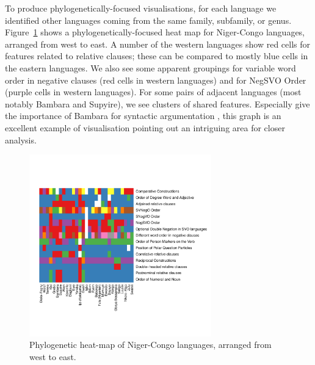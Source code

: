 \documentclass[11pt]{article}
\begin{document}
To produce phylogenetically-focused visualisations, for each language we identified other languages coming from the same family, subfamily, or genus. Figure~\ref{fig:heat2} shows a phylogenetically-focused heat map for Niger-Congo languages, arranged from west to east. A number of the western languages show red cells for features related to relative clauses; these can be compared to mostly blue cells in the eastern languages. We also see some apparent groupings for variable word order in negative clauses (red cells in western languages) and for NegSVO Order (purple cells in western languages). For some pairs of adjacent languages (most notably Bambara and Supyire), we see clusters of shared features. Especially give the importance of Bambara for 
syntactic argumentation \cite{culy}, this graph is an excellent example of visualisation pointing out an intriguing area for closer analysis.


\begin{figure}[ht!]
\includegraphics[width=3.1in]
{graph3nigercongo.pdf} 
\caption{Phylogenetic heat-map of Niger-Congo languages, arranged from west to east.} 
\label{fig:heat2} 
\end{figure}
\end{document}
